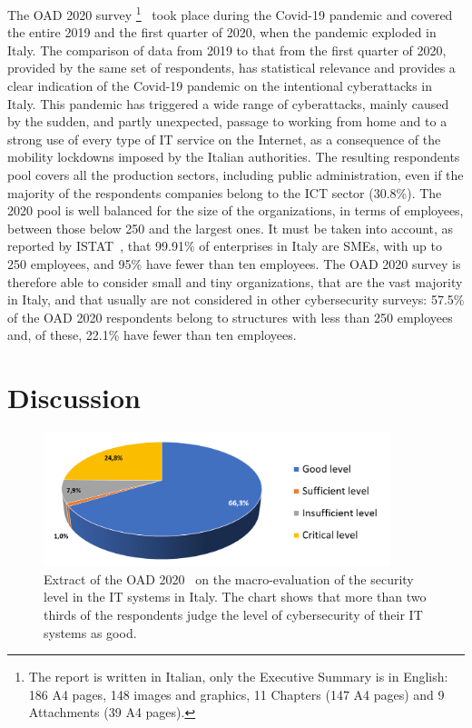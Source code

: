 \documentclass{easychair}
\begin{document}
The OAD 2020 survey
\footnote{The report is written in Italian,
  only the Executive Summary is in English: 186 A4 pages, 148 images and graphics, 11 Chapters
  (147 A4 pages) and 9 Attachments (39 A4 pages).}~\cite{oad20}
took place during the
Covid-19 pandemic and covered the entire 2019 and the first quarter
of 2020, when the pandemic exploded in Italy. The comparison of data from 2019 to that
from the first quarter of 2020, provided by the same set of respondents,
has statistical relevance and provides a 
clear indication of the Covid-19 pandemic on the intentional cyberattacks in Italy.
This pandemic has triggered a wide range of cyberattacks, mainly 
caused by the sudden, and partly unexpected, passage to working from home
and to a strong use of every type of IT service on the Internet, as a consequence
of the mobility lockdowns imposed by the Italian authorities. The resulting respondents pool
covers all the production sectors, including public administration,
even if the majority of the respondents companies belong to the ICT sector (30.8\%).
The 2020 pool is well balanced for the size of the organizations, in terms
of employees, between those below 250 and the largest ones. It must be taken into account,
as reported by ISTAT~\cite{istat21}, that 99.91\%
of enterprises in Italy are SMEs, with up to 250 employees, and 95\% have fewer than ten employees.
The OAD 2020 survey is therefore able to consider small and 
tiny organizations, that are the vast majority in Italy, and that usually
are not considered in other cybersecurity surveys: 57.5\% of the OAD 2020 respondents
belong to structures with less than 250 employees and, of these, 22.1\% have fewer than ten
employees. 

\section{Discussion}\label{sec:DataDiscussion}

\begin{figure}
	\centering
		\includegraphics[width=0.9\textwidth]{pictures/fig1.png}
		\caption{Extract of the OAD 2020~\cite{oad20} on the macro-evaluation
                  of the security level in the IT systems in Italy.
                  The chart shows that more than two thirds of the respondents
                  judge the level of cybersecurity of their IT systems as good.}
		\label{fig:1}
\end{figure}
\end{document}

